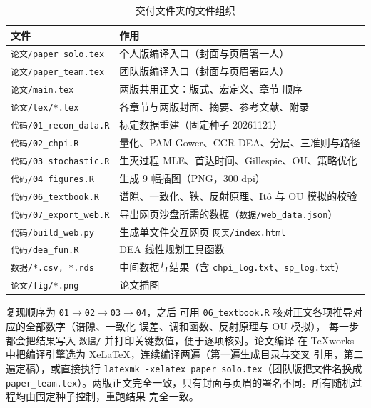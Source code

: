 \begin{table}[H]
\tabfont
\caption{交付文件夹的文件组织}
\label{tab:files}
\begin{tabularx}{\textwidth}{@{}p{4.9cm}X@{}}
\toprule
文件 & 作用 \\
\midrule
\texttt{论文/paper\_solo.tex} & 个人版编译入口（封面与页眉署一人） \\
\texttt{论文/paper\_team.tex} & 团队版编译入口（封面与页眉署四人） \\
\texttt{论文/main.tex} & 两版共用正文：版式、宏定义、章节 \verb|| 顺序 \\
\texttt{论文/tex/*.tex} & 各章节与两版封面、摘要、参考文献、附录 \\
\texttt{代码/01\_recon\_data.R} & 标定数据重建（固定种子 20261121） \\
\texttt{代码/02\_chpi.R} & 量化、PAM-Gower、CCR-DEA、分层、三准则与路径 \\
\texttt{代码/03\_stochastic.R} & 生灭过程 MLE、首达时间、Gillespie、OU、策略优化 \\
\texttt{代码/04\_figures.R} & 生成 9 幅插图（PNG，300 dpi） \\
\texttt{代码/06\_textbook.R} & 谱隙、一致化、鞅、反射原理、Itô 与 OU 模拟的校验 \\
\texttt{代码/07\_export\_web.R} & 导出网页沙盘所需的数据（\texttt{数据/web\_data.json}） \\
\texttt{代码/build\_web.py} & 生成单文件交互网页 \texttt{网页/index.html} \\
\texttt{代码/dea\_fun.R} & DEA 线性规划工具函数 \\
\texttt{数据/*.csv, *.rds} & 中间数据与结果（含 \texttt{chpi\_log.txt}、\texttt{sp\_log.txt}） \\
\texttt{论文/fig/*.png} & 论文插图 \\
\bottomrule
\end{tabularx}
\end{table}

复现顺序为 \texttt{01}$\to$\texttt{02}$\to$\texttt{03}$\to$\texttt{04}，之后
可用 \texttt{06\_textbook.R} 核对正文各项推导对应的全部数字（谱隙、一致化
误差、调和函数、反射原理与 OU 模拟），
每一步都会把结果写入 \texttt{数据/} 并打印关键数值，便于逐项核对。论文编译
在 TeXworks 中把编译引擎选为 XeLaTeX，连续编译两遍（第一遍生成目录与交叉
引用，第二遍定稿），或直接执行
\texttt{latexmk -xelatex paper\_solo.tex}（团队版把文件名换成
\texttt{paper\_team.tex}）。两版正文完全一致，只有封面与页眉的署名不同。所有随机过程均由固定种子控制，重跑结果
完全一致。






